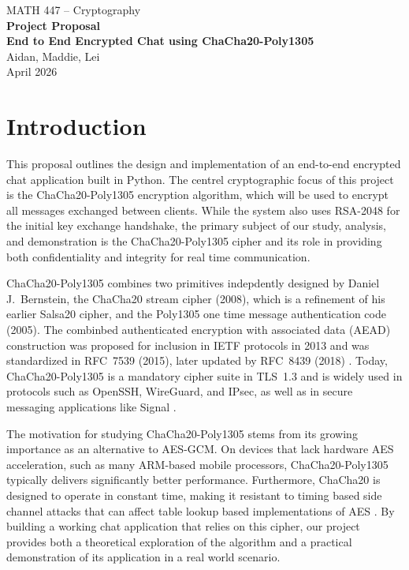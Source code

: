 \documentclass[12pt]{article}
\begin{document}
\begin{titlepage}
    \centering
    \vspace*{2in}
    {\large MATH 447 -- Cryptography} \\[0.5cm]
    {\LARGE \textbf{Project Proposal}} \\[1.5cm]
    {\Large \textbf{End to End Encrypted Chat using ChaCha20-Poly1305}} \\[2cm]

    {\large Aidan, Maddie, Lei} \\[0.3cm]
    {\large April 2026}

    \vfill
\end{titlepage}

\section{Introduction}

    This proposal outlines the design and implementation of an end-to-end encrypted chat 
    application built in Python. The centrel cryptographic focus of this project is the 
    ChaCha20-Poly1305 encryption algorithm, which will be used to encrypt all messages 
    exchanged between clients. While the system also uses RSA-2048 for the initial 
    key exchange handshake, the primary subject of our study, analysis, and demonstration
    is the ChaCha20-Poly1305 cipher and its role in providing both confidentiality and  
    integrity for real time communication.

    ChaCha20-Poly1305 combines two primitives indepdently designed by Daniel J.\ 
    Bernstein, the ChaCha20 stream cipher (2008), which is a refinement of his 
    earlier Salsa20 cipher, and the Poly1305 one time message authentication code (2005).
    The combinbed authenticated encryption with associated data (AEAD) construction 
    was proposed for inclusion in IETF protocols in 2013 and was standardized in RFC~7539 (2015),
    later updated by RFC~8439 (2018) \cite{rfc8439}. Today, ChaCha20-Poly1305 is a 
    mandatory cipher suite in TLS~1.3 and is widely used in protocols such as OpenSSH,
    WireGuard, and IPsec, as well as in secure messaging applications like Signal \cite{rfc7905}.

    The motivation for studying ChaCha20-Poly1305 stems from its growing importance as an 
    alternative to AES-GCM. On devices that lack hardware AES acceleration, such as many ARM-based
    mobile processors, ChaCha20-Poly1305 typically delivers significantly better performance.
    Furthermore, ChaCha20 is designed to operate in constant time, making it resistant to timing based
    side channel attacks that can affect table lookup based implementations of AES \cite{cloudflare}.
    By building a working chat application that relies on this cipher, our project provides both a 
    theoretical exploration of the algorithm and a practical demonstration of its application in 
    a real world scenario.
\end{document}

